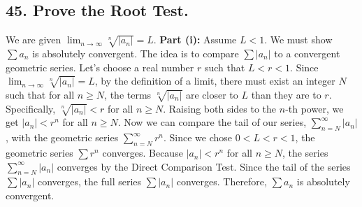 \documentclass{article}
\begin{document}
\subsection*{45. Prove the Root Test.}
We are given $\lim_{n \to \infty} \sqrt[n]{|a_n|} = L$.
\textbf{Part (i):} Assume $L < 1$. We must show $\sum a_n$ is absolutely convergent.
The idea is to compare $\sum |a_n|$ to a convergent geometric series.
Let's choose a real number $r$ such that $L < r < 1$.
Since $\lim_{n \to \infty} \sqrt[n]{|a_n|} = L$, by the definition of a limit, there must exist an integer $N$ such that for all $n \ge N$, the terms $\sqrt[n]{|a_n|}$ are closer to $L$ than they are to $r$. Specifically, $\sqrt[n]{|a_n|} < r$ for all $n \ge N$.
Raising both sides to the $n$-th power, we get $|a_n| < r^n$ for all $n \ge N$.
Now we can compare the tail of our series, $\sum_{n=N}^{\infty} |a_n|$, with the geometric series $\sum_{n=N}^{\infty} r^n$.
Since we chose $0 < L < r < 1$, the geometric series $\sum r^n$ converges.
Because $|a_n| < r^n$ for all $n \ge N$, the series $\sum_{n=N}^{\infty} |a_n|$ converges by the Direct Comparison Test.
Since the tail of the series $\sum |a_n|$ converges, the full series $\sum |a_n|$ converges.
Therefore, $\sum a_n$ is absolutely convergent.
\end{document}
